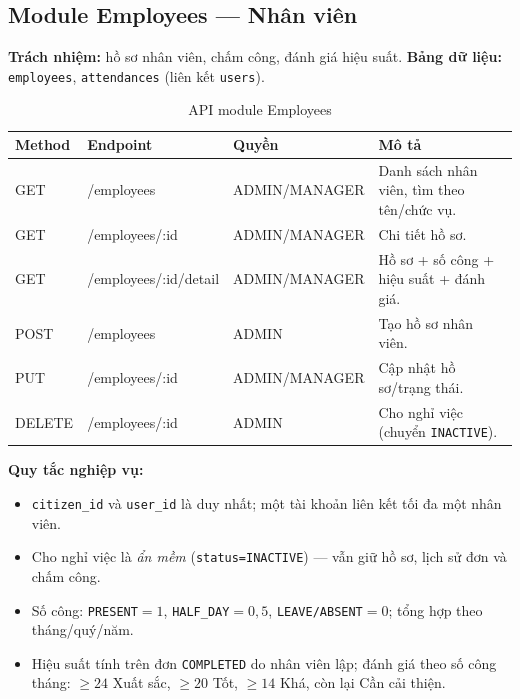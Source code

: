 \documentclass[12pt,a4paper]{report}
\begin{document}
\subsection{Module Employees --- Nhân viên}
\textbf{Trách nhiệm:} hồ sơ nhân viên, chấm công, đánh giá hiệu suất. \textbf{Bảng dữ liệu:} \texttt{employees}, \texttt{attendances} (liên kết \texttt{users}).
\begin{table}[H]\centering\small
\begin{tabularx}{\textwidth}{|L{1.5cm}|L{3.6cm}|L{3.4cm}|X|}
\hline
\textbf{Method} & \textbf{Endpoint} & \textbf{Quyền} & \textbf{Mô tả} \\ \hline
GET & /employees & ADMIN/MANAGER & Danh sách nhân viên, tìm theo tên/chức vụ. \\ \hline
GET & /employees/:id & ADMIN/MANAGER & Chi tiết hồ sơ. \\ \hline
GET & /employees/:id/\allowbreak detail & ADMIN/MANAGER & Hồ sơ + số công + hiệu suất + đánh giá. \\ \hline
POST & /employees & ADMIN & Tạo hồ sơ nhân viên. \\ \hline
PUT & /employees/:id & ADMIN/MANAGER & Cập nhật hồ sơ/trạng thái. \\ \hline
DELETE & /employees/:id & ADMIN & Cho nghỉ việc (chuyển \texttt{INACTIVE}). \\ \hline
\end{tabularx}
\caption{API module Employees}
\end{table}
\textbf{Quy tắc nghiệp vụ:}
\begin{itemize}[leftmargin=1.4cm,nosep]
  \item \texttt{citizen\_id} và \texttt{user\_id} là duy nhất; một tài khoản liên kết tối đa một nhân viên.
  \item Cho nghỉ việc là \emph{ẩn mềm} (\texttt{status=INACTIVE}) --- vẫn giữ hồ sơ, lịch sử đơn và chấm công.
  \item Số công: \texttt{PRESENT}${}=1$, \texttt{HALF\_DAY}${}=0{,}5$, \texttt{LEAVE/ABSENT}${}=0$; tổng hợp theo tháng/quý/năm.
  \item Hiệu suất tính trên đơn \texttt{COMPLETED} do nhân viên lập; đánh giá theo số công tháng: $\ge 24$ Xuất sắc, $\ge 20$ Tốt, $\ge 14$ Khá, còn lại Cần cải thiện.
\end{itemize}
\end{document}
